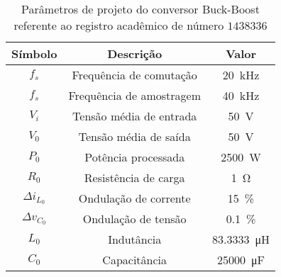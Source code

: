 \begin{table}[!ht]
\centering
\caption{Parâmetros de projeto do conversor Buck-Boost referente ao registro acadêmico de número $1438336$}
\label{tab:parametros}
\begin{tabular}{@{}ccc@{}}
\toprule
\textbf{Símbolo} & \textbf{Descrição} & \textbf{Valor}\\ \midrule
$f_s$ & Frequência de comutação & \SI{20}{\kilo\hertz}\\
$f_s$ & Frequência de amostragem & \SI{40}{\kilo\hertz}\\
$V_i$ & Tensão média de entrada  & \SI{50}{\V}\\
$V_0$ & Tensão média de saída  & \SI{50}{\V} \\
$P_0$ & Potência processada  & \SI{2500}{\W} \\
$R_0$ & Resistência de carga & \SI{1}{\ohm} \\
$\Delta{i_{L_0}}$  & Ondulação de corrente & \SI{15}{\%}\\
$\Delta{v_{C_0}}$  & Ondulação de tensão & \SI{0.1}{\%}\\
$L_0$ & Indutância & \SI{83.3333}{\micro\henry}\\
$C_0$ & Capacitância & \SI{25000}{\micro\farad}\\
\bottomrule
\end{tabular}
\end{table}

